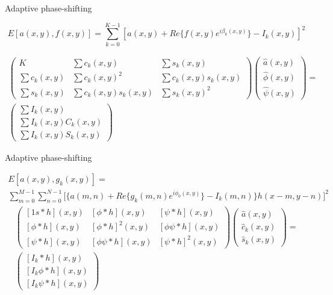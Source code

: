 \documentclass[]{beamer}
\begin{document}
\begin{frame}{Adaptive phase-shifting }
\begin{center}

\begin{equation*}
  E[a(x,y),f(x,y)]=\sum_{k=0}^{K-1}[a(x,y) + Re\{f(x,y) e^{i\beta_k (x,y)} \} -
I_k (x,y)]^2
\end{equation*}

\footnotesize{
\begin{multline*}
\left(\begin{array}{ccc}
K & \sum c_{k}(x,y) & \sum s_{k}(x,y)\\
\sum c_{k}(x,y) & \sum c_{k}(x,y)^{2} & \sum c_{k}(x,y)s_{k}(x,y)\\
\sum s_{k}(x,y) & \sum c_{k}(x,y)s_{k}(x,y) & \sum s_{k}(x,y)^{2}
\end{array}\right)\left(\begin{array}{c}
\hat{a}(x,y)\\
\hat{\phi}(x,y)\\
\hat{\psi}(x,y)
\end{array}\right) = \\ \left(\begin{array}{c}
\sum I_{k}(x,y)\\
\sum I_{k}(x,y)C_{k}(x,y)\\
\sum I_{k}(x,y)S_{k}(x,y)
\end{array}\right)
\end{multline*}
}
\end{center}
\end{frame}
\begin{frame}{Adaptive phase-shifting}
\begin{center}

\begin{multline*}
E[a(x,y),g_{k}(x,y)]= \\ \sum_{m=0}^{M-1}\sum_{n=0}^{N-1}\Bigg[\{a(m,n)+Re\{g_{k}(m,
n)e^ { i\phi_{0}(x,y)}\}-I_{k}(m,n)\}h(x-m,y-n)\Bigg]^{2}
\end{multline*}
\begin{multline*}
 \left(\begin{array}{ccc}
[1s*h](x,y) & [\phi*h](x,y) & [\psi*h](x,y)\\{}
[\phi*h](x,y) & [\phi*h]^{2}(x,y) & [\phi\psi*h](x,y)\\{}
[\psi*h](x,y) & [\phi\psi*h](x,y) & [\psi*h]^{2}(x,y)
\end{array}\right)\left(\begin{array}{c}
\hat{a}(x,y)\\
\hat{c}_{k}(x,y)\\
\hat{s}_{k}(x,y)
\end{array}\right)= \\ \left(\begin{array}{c}
[I_{k}*h](x,y)\\{}
[I_{k}\phi*h](x,y)\\{}
[I_{k}\psi*h](x,y)
\end{array}\right)
\end{multline*}


\end{center}
\end{frame}
\end{document}
